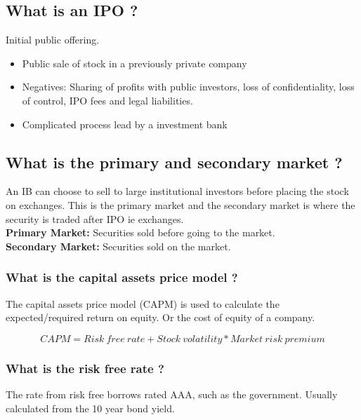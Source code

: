 \documentclass[11pt]{scrartcl} %
\begin{document}
\subsection{What is an IPO ?}

Initial public offering.

\begin{itemize}
	\item Public sale of stock in a previously private company
	\item Negatives: Sharing of profits with public investors, loss of confidentiality, loss of control, IPO fees and legal liabilities.
	\item Complicated process lead by a investment bank
\end{itemize}

\subsection{What is the primary and secondary market ?}

An IB can choose to sell to large institutional investors before placing the stock on exchanges. This is the primary market and the secondary market is where the security is traded after IPO ie exchanges. \\

\textbf{Primary Market:} Securities sold before going to the market. \\

\textbf{Secondary Market:} Securities sold on the market. \\

\subsubsection{What is the capital assets price model ?}

The capital assets price model (CAPM) is used to calculate the expected/required return on equity. Or the cost of equity of a company.

\[ CAPM = Risk\:free\:rate + Stock\:volatility*Market\:risk\:premium \]

\subsubsection{What is the risk free rate ?}

The rate from risk free borrows rated AAA, such as the government. Usually calculated from the 10 year bond yield.
\end{document}
